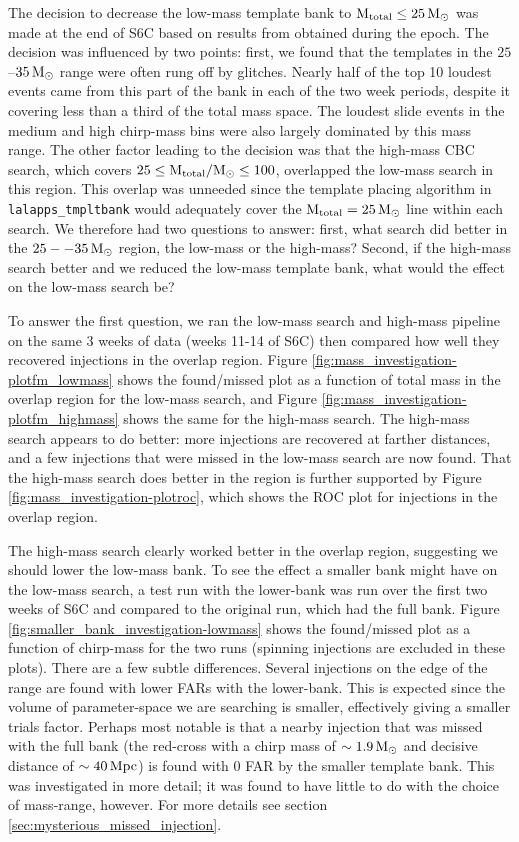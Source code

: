 The decision to decrease the low-mass template bank to $\mathrm{M_{total}} \leq 25\,\mathrm{M_\odot}$ was made at the end of S6C based on results from obtained during the epoch. The decision was influenced by two points: first, we found that the templates in the $25$--$35\,\mathrm{M_\odot}$ range were often rung off by glitches. Nearly half of the top 10 loudest events came from this part of the bank in each of the two week periods, despite it covering less than a third of the total mass space. The loudest slide events in the medium and high chirp-mass bins were also largely dominated by this mass range. The other factor leading to the decision was that the high-mass \ac{CBC} search, which covers $25 \leq \mathrm{M_{total}}/\mathrm{M_\odot} \leq 100$, overlapped the low-mass search in this region. This overlap was unneeded since the template placing algorithm in \texttt{lalapps\_tmpltbank} would adequately cover the $\mathrm{M_{total}} = 25\,\mathrm{M_\odot}$ line within each search. We therefore had two questions to answer: first, what search did better in the $25 -- 35\,\mathrm{M_\odot}$ region, the low-mass or the high-mass? Second, if the high-mass search better and we reduced the low-mass template bank, what would the effect on the low-mass search be?

To answer the first question, we ran the low-mass search and high-mass pipeline on the same 3 weeks of data (weeks 11-14 of S6C) then compared how well they recovered injections in the overlap region. Figure \ref{fig:mass_investigation-plotfm_lowmass} shows the found/missed plot as a function of total mass in the overlap region for the low-mass search, and Figure \ref{fig:mass_investigation-plotfm_highmass} shows the same for the high-mass search. The high-mass search appears to do better: more injections are recovered at farther distances, and a few injections that were missed in the low-mass search are now found. That the high-mass search does better in the region is further supported by Figure \ref{fig:mass_investigation-plotroc}, which shows the ROC plot for injections in the overlap region.

The high-mass search clearly worked better in the overlap region, suggesting we should lower the low-mass bank. To see the effect a smaller bank might have on the low-mass search, a test run with the lower-bank was run over the first two weeks of S6C and compared to the original run, which had the full bank. Figure \ref{fig:smaller_bank_investigation-lowmass} shows the found/missed plot as a function of chirp-mass for the two runs (spinning injections are excluded in these plots). There are a few subtle differences. Several injections on the edge of the range are found with lower \acp{FAR} with the lower-bank. This is expected since the volume of parameter-space we are searching is smaller, effectively giving a smaller trials factor. Perhaps most notable is that a nearby injection that was missed with the full bank (the red-cross with a chirp mass of $\sim1.9\,\mathrm{M_\odot}$ and decisive distance of $\sim40\,\mathrm{Mpc}$) is found with 0 \ac{FAR} by the smaller template bank. This was investigated in more detail; it was found to have little to do with the choice of mass-range, however. For more details see section \ref{sec:mysterious_missed_injection}.

